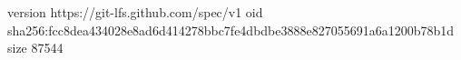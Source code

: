 version https://git-lfs.github.com/spec/v1
oid sha256:fcc8dea434028e8ad6d414278bbc7fe4dbdbe3888e827055691a6a1200b78b1d
size 87544
